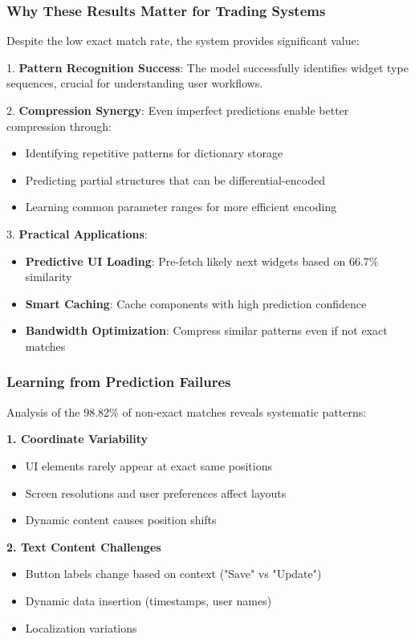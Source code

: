 \documentclass[12pt,a4paper]{article}
\begin{document}
\subsubsection{Why These Results Matter for Trading Systems}

Despite the low exact match rate, the system provides significant value:

1. \textbf{Pattern Recognition Success}: The model successfully identifies widget type sequences, crucial for understanding user workflows.

2. \textbf{Compression Synergy}: Even imperfect predictions enable better compression through:
   \begin{itemize}
   \item Identifying repetitive patterns for dictionary storage
   \item Predicting partial structures that can be differential-encoded
   \item Learning common parameter ranges for more efficient encoding
   \end{itemize}

3. \textbf{Practical Applications}:
   \begin{itemize}
   \item \textbf{Predictive UI Loading}: Pre-fetch likely next widgets based on 66.7\% similarity
   \item \textbf{Smart Caching}: Cache components with high prediction confidence
   \item \textbf{Bandwidth Optimization}: Compress similar patterns even if not exact matches
   \end{itemize}

\subsubsection{Learning from Prediction Failures}

Analysis of the 98.82\% of non-exact matches reveals systematic patterns:

\textbf{1. Coordinate Variability}
\begin{itemize}
\item UI elements rarely appear at exact same positions
\item Screen resolutions and user preferences affect layouts
\item Dynamic content causes position shifts
\end{itemize}

\textbf{2. Text Content Challenges}
\begin{itemize}
\item Button labels change based on context ("Save" vs "Update")
\item Dynamic data insertion (timestamps, user names)
\item Localization variations
\end{itemize}
\end{document}
